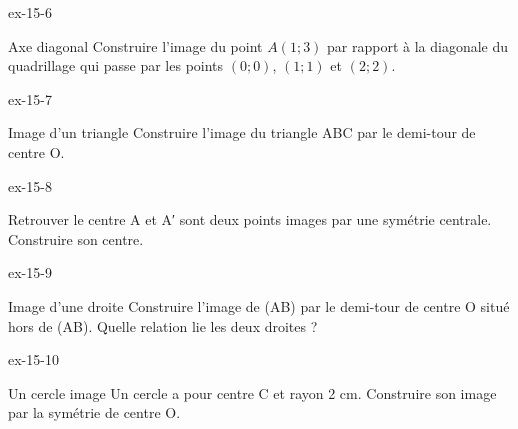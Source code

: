 \begin{blocLivre}{ex-15-6}\begin{exercice}[2]{Axe diagonal}
Construire l’image du point $A(1;3)$ par rapport à la diagonale du quadrillage qui passe par les points $(0;0)$, $(1;1)$ et $(2;2)$.
\label{fig-ex-15-6}
\end{exercice}\end{blocLivre}
\begin{blocLivre}{ex-15-7}\begin{exercice}[2]{Image d’un triangle}
Construire l’image du triangle ABC par le demi-tour de centre O.
\label{fig-ex-15-7}
\end{exercice}\end{blocLivre}
\begin{blocLivre}{ex-15-8}\begin{exercice}[2]{Retrouver le centre}
A et A′ sont deux points images par une symétrie centrale. Construire son centre.
\label{fig-ex-15-8}
\end{exercice}\end{blocLivre}
\begin{blocLivre}{ex-15-9}\begin{exercice}[2]{Image d’une droite}
Construire l’image de (AB) par le demi-tour de centre O situé hors de (AB). Quelle relation lie les deux droites ?
\label{fig-ex-15-9}
\end{exercice}\end{blocLivre}
\begin{blocLivre}{ex-15-10}\begin{exercice}[2]{Un cercle image}
Un cercle a pour centre C et rayon 2 cm. Construire son image par la symétrie de centre O.
\label{fig-ex-15-10}
\end{exercice}\end{blocLivre}

